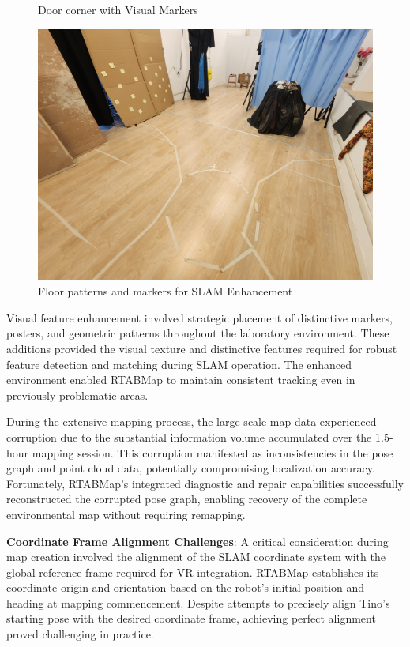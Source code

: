 \begin{figure}[H]
\begin{minipage}{0.32\textwidth}
        \caption{Door corner with Visual Markers}
        \label{fig:door_corner_features}
    \end{minipage}
    \hfill
    \begin{minipage}{0.32\textwidth}
        \centering
        \includegraphics[width=\textwidth]{Images/LabVisualAids (7).jpg}
        \caption{Floor patterns and markers for SLAM Enhancement}
        \label{fig:floor_patterns}
    \end{minipage}
\end{figure}

Visual feature enhancement involved strategic placement of distinctive markers, posters, and geometric patterns throughout the laboratory environment. These additions provided the visual texture and distinctive features required for robust feature detection and matching during SLAM operation. The enhanced environment enabled RTABMap to maintain consistent tracking even in previously problematic areas.

During the extensive mapping process, the large-scale map data experienced corruption due to the substantial information volume accumulated over the 1.5-hour mapping session. This corruption manifested as inconsistencies in the pose graph and point cloud data, potentially compromising localization accuracy. Fortunately, RTABMap's integrated diagnostic and repair capabilities successfully reconstructed the corrupted pose graph, enabling recovery of the complete environmental map without requiring remapping.

\textbf{Coordinate Frame Alignment Challenges}: A critical consideration during map creation involved the alignment of the SLAM coordinate system with the global reference frame required for VR integration. RTABMap establishes its coordinate origin and orientation based on the robot's initial position and heading at mapping commencement. Despite attempts to precisely align Tino's starting pose with the desired coordinate frame, achieving perfect alignment proved challenging in practice.

